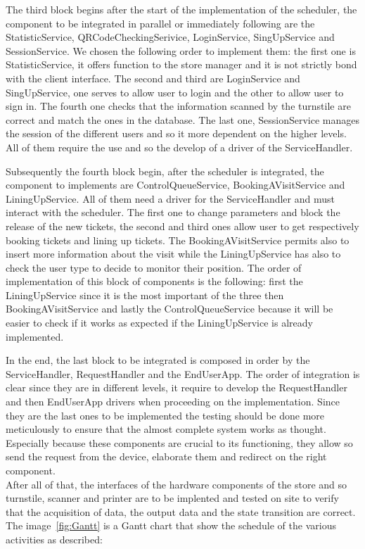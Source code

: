 The third block begins after the start of the implementation of the scheduler, the component to be integrated in parallel or immediately following are the StatisticService, QRCodeCheckingSerivice, LoginService, SingUpService and SessionService.
We chosen the following order to implement them:
the first one is StatisticService, it offers function to the store manager and it is not strictly bond with the client interface. The second and third are LoginService and SingUpService, one serves to allow user to login and the other to allow user to sign in. The fourth one checks that the information scanned by the turnstile are correct and match the ones in the database. The last one, SessionService manages the session of the different users and so it more dependent on the higher levels. All of them require the use and so the develop of a driver of the ServiceHandler.

Subsequently the fourth block begin, after the scheduler is integrated, the component to implements are ControlQueueService, BookingAVisitService and LiningUpService. All of them need a driver for the ServiceHandler and must interact with the scheduler. The first one to change parameters and block the release of the new tickets, the second and third ones allow user to get respectively booking tickets and lining up tickets. The BookingAVisitService permits also to insert more information about the visit while the LiningUpService has also to check the user type to decide to monitor their position. The order of implementation of this block of components is the following: first the LiningUpService since it is the most important of the three then BookingAVisitService and lastly the ControlQueueService because it will be easier to check if it works as expected if the LiningUpService is already implemented.

In the end, the last block to be integrated is composed in order by the ServiceHandler, RequestHandler and the EndUserApp. The order of integration is clear since they are in different levels, it require to develop the RequestHandler and then EndUserApp drivers when proceeding on the implementation. 
Since they are the last ones to be implemented the testing should be done more meticulously to ensure that the almost complete system works as thought. Especially because these components are crucial to its functioning, they allow so send the request from the device, elaborate them and redirect on the right component.\\
After all of that, the interfaces of the hardware components of the store and so turnstile, scanner and printer are to be implented and tested on site to verify that the acquisition of data, the output data and the state transition are correct. \\
The image~\ref{fig:Gantt} is a Gantt chart that show the schedule of the various activities as described:

